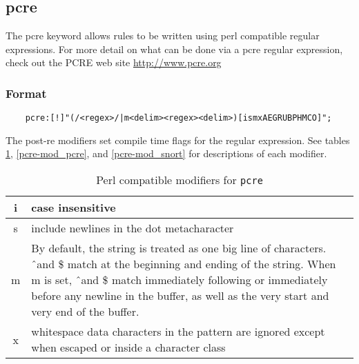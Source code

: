 \documentclass[english]{report}
\begin{document}
\subsection{pcre}
\label{pcre}

The pcre keyword allows rules to be written using perl compatible regular
expressions.   For more detail on what can be done via a pcre regular
expression, check out the PCRE web site \url{http://www.pcre.org}

\subsubsection{Format}

\begin{verbatim}
    pcre:[!]"(/<regex>/|m<delim><regex><delim>)[ismxAEGRUBPHMCO]";
\end{verbatim}

The post-re modifiers set compile time flags for the regular expression.  See tables
\ref{pcre-mod_perl}, \ref{pcre-mod_pcre}, and \ref{pcre-mod_snort} for descriptions
of each modifier.

\begin{table}[ht]
\begin{center}
\caption{Perl compatible modifiers for \texttt{pcre}}
\label{pcre-mod_perl}
\begin{tabular}{|c|p{4.5in}|}

\hline
i & case insensitive \\

\hline
s & include newlines in the dot metacharacter \\

\hline
m &

By default, the string is treated as one big line of characters.  \^\ and \$
match at the beginning and ending of the string. When m is set, \^\ and \$
match immediately following or immediately before any newline in the buffer, as
well as the very start and very end of the buffer. \\

\hline
x &

whitespace  data characters in the pattern are ignored except when escaped or
inside a character class \\

\hline
\end{tabular}
\end{center}
\end{table}
\end{document}
